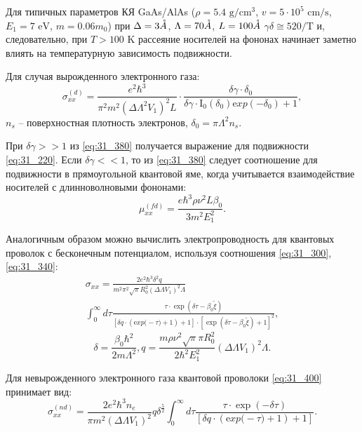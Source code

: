 Для типичных параметров КЯ GaAs/AlAs ($\rho =5.4 \text{ g} / \text{cm}^3 $, $v=5\cdot 10^{5} \text{ cm/s}$, $E_{1} =7 \text{  eV}$, $m=0.06m_{0} $) при $\Delta =3 \AA$, $\Lambda =70 \AA$, $L = 100 \AA$  $\gamma \delta \cong 520/\text{T}$ и, следовательно, при $T>100\text{ K}$ рассеяние носителей на фононах начинает заметно влиять на температурную зависимость подвижности.

Для случая вырожденного электронного газа:
\begin{equation} \label{eq:31_380}
\sigma _{xx}^{(d)} =\frac{e^{2} \hbar ^{3} }{\pi ^{2} m^{2} \left(\Delta \Lambda ^{2} V_{1} \right)^{2} L} \cdot \frac{\delta \gamma \cdot \delta _{0} }{\delta \gamma \cdot {\mathrm I}_{{\mathrm 0}} \left(\delta _{0} \right){\mathrm exp}(-\delta _{0} )+1} ,
\end{equation}
$n_{s} $ -- поверхностная плотность электронов, $\delta _{0} =\pi \Lambda ^{2} n_{s} $.

При $\delta \gamma >>1$ из \eqref{eq:31_380} получается выражение для подвижности \eqref{eq:31_220}. Если $\delta \gamma <<1$, то из \eqref{eq:31_380} следует соотношение для подвижности в прямоугольной квантовой яме, когда учитывается взаимодействие носителей с длинноволновыми фононами:
\begin{equation} \label{eq:31_390}
\mu _{xx}^{(fd)} =\frac{e\hbar ^{3} \rho \nu ^{2} L\beta _{0} }{3m^{2} E_{1}^{2} }. 
\end{equation}
 
Аналогичным образом можно вычислить электропроводность для квантовых проволок с бесконечным потенциалом, используя соотношения \eqref{eq:31_300}, \eqref{eq:31_340}:
\begin{multline} \label{eq:31_400}
\sigma _{xx} =\frac{2e^{2} \hbar ^{3} \delta ^{2} q}{m^{2} \pi ^{2} \sqrt{\pi } R_{0}^{2} \left(\Delta \Lambda V_{1} \right)^{2} \Lambda } \\
\int _{0}^{\infty }d\tau \frac{\tau \cdot {\exp}\left(\delta \tau -\beta _{0} \tilde{\xi }\right)}{\left[\delta q\cdot \left({\mathrm exp(}-\tau )+1\right)+1\right]\cdot \left[{\exp}\left(\delta \tau -\beta _{0} \tilde{\xi }\right)+1\right]^{2} }, 
\end{multline}
\[\delta =\frac{\beta _{0} \hbar ^{2} }{2m\Lambda ^{2} } , q=\frac{m\rho \nu ^{2} \sqrt{\pi } \pi R_{0}^{2} }{2\hbar ^{2} E_{1}^{2} } \left(\Delta \Lambda V_{1} \right)^{2} \Lambda .\] 

Для невырожденного электронного газа квантовой проволоки \eqref{eq:31_400} принимает вид:
\begin{equation} \label{eq:31_410}
\sigma _{xx}^{(nd)} =\frac{2e^{2} \hbar ^{3} n_{e} }{\pi m^{2} \left(\Delta \Lambda V_{1} \right)^{2} } q\delta ^{\frac{5}{2} } \int _{0}^{\infty }d\tau \frac{\tau \cdot \exp (-\delta \tau )}{\left[\delta q\cdot \left({\mathrm exp(}-\tau )+1\right)+1\right]}. 
 \end{equation}

